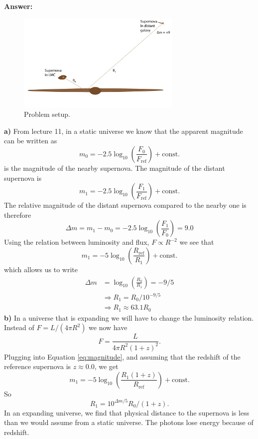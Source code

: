 \documentclass[a4paper,12pt]{article}
\theoremstyle{remark}
\newcommand{\mrm}[1]{\mathrm{#1}}
\renewcommand{\=}[1]{\stackrel{#1}{=}} %
\theoremstyle{plain}
\theoremstyle{definition}
\begin{document}
\textbf{Answer:} 
\begin{figure}[t]
\begin{center}
    \includegraphics*[angle=0,width=0.7\textwidth]{img/problem.png}
    \caption[Problem setup]{Problem setup.}
\label{fig:problem}
\end{center}
\end{figure}
\textbf{a)} From lecture 11, in a static universe we know that the apparent magnitude can be written as
\begin{equation}
m _0 = -2.5 \log _{10}  \left( \frac{F_0}{F _\mrm{ref}} \right) + \mrm{const}.
\end{equation} 
is the magnitude of the nearby supernova. The magnitude of the distant supernova is 
\begin{equation}
m _1 = -2.5 \log _{10}  \left( \frac{F_1}{F _\mrm{ref}} \right) + \mrm{const}.
\end{equation}
The relative magnitude of the distant supernova compared to the nearby one is therefore 
\begin{equation}
\Delta m = m _1 - m _0 = -2.5 \log _{10}  \left( \frac{F_1}{F _0} \right) = 9.0
\end{equation}
Using the relation between luminosity and flux, $F \propto R^{-2}$ we see that 
\begin{equation}
m _1 = -5 \log _{10}  \left( \frac{R_\mrm{ref}}{R _1} \right) + \mrm{const}.
\label{eq:magnitude}
\end{equation}
which allows us to write
\begin{align}
\Delta m &=  \log _{10}  \left( \frac{R_0}{R _1} \right) = -9/5 \\
& \Rightarrow R_1 = R_0/10^{-9/5} \\
& \Rightarrow R_1 \approx 63.1 R_0
\end{align}
\textbf{b)} In a universe that is expanding we will have to change the luminosity relation. Instead of $F = L/(4\pi R^{2})$ we now have 
\begin{equation}
F = \frac{L}{4\pi R^{2} (1+z)^{2}}.
\end{equation}
Plugging into Equation \ref{eq:magnitude}, and assuming that the redshift of the reference supernova is $z \approx 0.0$, we get
\begin{equation}
m _1 = -5 \log _{10}  \left( \frac{R_1(1+z)}{R _\mrm{ref}} \right) + \mrm{const}.
\end{equation}
So
\begin{equation}
R_1 = 10^{\Delta m/5} R_0 / (1+z).
\end{equation}
In an expanding universe, we find that physical distance to the supernova is less than we would assume from a static universe. The photons lose energy because of redshift.
 
\end{document}
